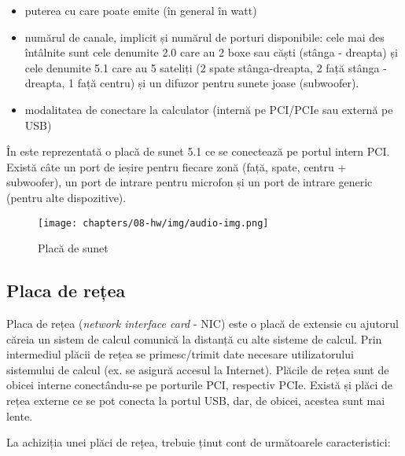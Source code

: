 \begin{itemize}
  \item puterea cu care poate emite (în general în watt)
  \item numărul de canale, implicit și numărul de porturi disponibile:
          cele mai des întâlnite sunt cele denumite 2.0 care au 2 boxe sau
          căști (stânga - dreapta) și cele denumite 5.1 care au 5 sateliți (2
          spate stânga-dreapta, 2 față stânga - dreapta, 1 față centru) și un difuzor
          pentru sunete joase (subwoofer).
  \item modalitatea de conectare la calculator (internă pe PCI/PCIe sau
          externă pe USB)
\end{itemize}

În  este reprezentată o placă de sunet 5.1
ce se conectează pe portul intern PCI. Există câte un port de ieșire pentru
fiecare zonă (față, spate, centru + subwoofer), un port de intrare pentru microfon și un
port de intrare generic (pentru alte dispozitive).

\begin{figure}[!htbp]
  \centering
  \texttt{[image: chapters/08-hw/img/audio-img.png]}
  \caption{Placă de sunet\protect\footnotemark}
  \label{fig:hw:audio}
\end{figure}

\subsection{Placa de rețea}
\label{sec:hw:extension:nic}

Placa de rețea (\textit{network interface card} - NIC) este o placă de extensie cu ajutorul căreia un sistem de calcul
comunică la distanță cu alte sisteme de calcul. Prin intermediul plăcii de rețea
se primesc/trimit date necesare utilizatorului sistemului de calcul (ex. se
asigură accesul la Internet). Plăcile de rețea sunt de obicei interne
conectându-se pe porturile PCI, respectiv PCIe. Există și plăci de rețea externe
ce se pot conecta la portul USB, dar, de obicei, acestea sunt mai lente.

La achiziția unei plăci de rețea, trebuie ținut cont de următoarele caracteristici:

